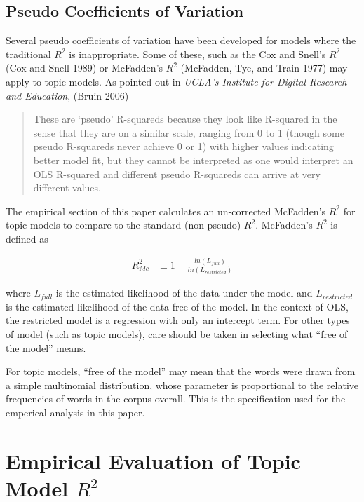\documentclass[conference,final,]{IEEEtran}
\begin{document}
\hypertarget{pseudo-coefficients-of-variation}{%
\subsection{Pseudo Coefficients of
Variation}\label{pseudo-coefficients-of-variation}}

Several pseudo coefficients of variation have been developed for models
where the traditional \(R^2\) is inappropriate. Some of these, such as
the Cox and Snell's \(R^2\) (Cox and Snell 1989) or McFadden's \(R^2\)
(McFadden, Tye, and Train 1977) may apply to topic models. As pointed
out in \emph{UCLA's Institute for Digital Research and Education},
(Bruin 2006)

\begin{quote}
These are `pseudo' R-squareds because they look like R-squared in the sense that they are on a similar scale, ranging from 0 to 1 (though some pseudo R-squareds never achieve 0 or 1) with higher values indicating better model fit, but they cannot be interpreted as one would interpret an OLS R-squared and different pseudo R-squareds can arrive at very different values. 
\end{quote}

The empirical section of this paper calculates an un-corrected
McFadden's \(R^2\) for topic models to compare to the standard
(non-pseudo) \(R^2\). McFadden's \(R^2\) is defined as

\begin{align}
    R^2_{Mc} & \equiv 1 - \frac{ ln( L_{full} ) }{ ln( L_{restricted} ) }
\end{align}

where \(L_{full}\) is the estimated likelihood of the data under the
model and \(L_{restricted}\) is the estimated likelihood of the data
free of the model. In the context of OLS, the restricted model is a
regression with only an intercept term. For other types of model (such
as topic models), care should be taken in selecting what ``free of the
model'' means.

For topic models, ``free of the model'' may mean that the words were
drawn from a simple multinomial distribution, whose parameter is
proportional to the relative frequencies of words in the corpus overall.
This is the specification used for the emperical analysis in this paper.

\hypertarget{empirical-evaluation-of-topic-model-r2}{%
\section{\texorpdfstring{Empirical Evaluation of Topic Model
\(R^2\)}{Empirical Evaluation of Topic Model R\^{}2}}\label{empirical-evaluation-of-topic-model-r2}}
\end{document}
